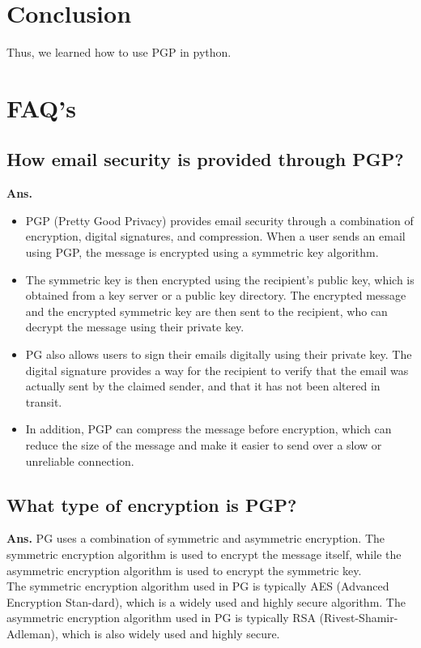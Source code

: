 \documentclass{article}
\begin{document}
\section{\textbf{Conclusion}}
Thus, we learned how to use PGP in python.
\section{\textbf{FAQ's}}
\subsection{\textbf{How email security is provided through PGP?}}
\textbf{Ans.} \begin{itemize}
	\item PGP (Pretty Good Privacy) provides email security through a combination of encryption, digital signatures, and compression. When a user sends an email using PGP, the message is encrypted using a symmetric key algorithm.
	\item The symmetric key is then encrypted using the recipient's public key, which is obtained from a key server or a public key directory. The encrypted message and the encrypted symmetric key are then sent to the recipient, who can decrypt the message using their private key.
	\item PG also allows users to sign their emails digitally using their private key. The digital signature provides a way for the recipient to verify that the email was actually sent by the claimed sender, and that it has not been altered in transit.
	\item In addition, PGP can compress the message before encryption, which can reduce the size of the message and make it easier to send over a slow or unreliable connection.
\end{itemize}
\subsection{\textbf{What type of encryption is PGP?}}
\textbf{Ans.} PG uses a combination of symmetric and asymmetric encryption. The symmetric encryption algorithm is used to encrypt the message itself, while the asymmetric encryption algorithm is used to encrypt the symmetric key.\\

The symmetric encryption algorithm used in PG is typically AES (Advanced Encryption Stan-dard), which is a widely used and highly secure algorithm. The asymmetric encryption algorithm used in PG is typically RSA (Rivest-Shamir-Adleman), which is also widely used and highly secure.
\end{document}
